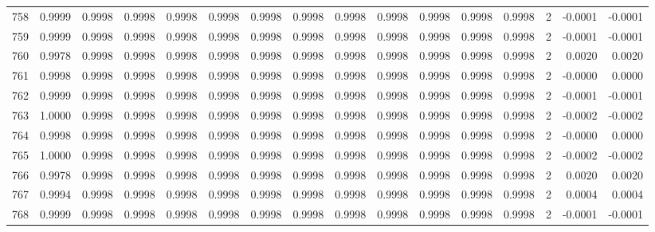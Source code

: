 \begin{tabular}{lrrrrrrrrrrrrrrr}
758 &      0.9999 &  0.9998 &  0.9998 &  0.9998 &  0.9998 &  0.9998 &  0.9998 &  0.9998 &  0.9998 &  0.9998 &   0.9998 &     0.9998 &      2 &                   -0.0001 &                    -0.0001 \\
759 &      0.9999 &  0.9998 &  0.9998 &  0.9998 &  0.9998 &  0.9998 &  0.9998 &  0.9998 &  0.9998 &  0.9998 &   0.9998 &     0.9998 &      2 &                   -0.0001 &                    -0.0001 \\
760 &      0.9978 &  0.9998 &  0.9998 &  0.9998 &  0.9998 &  0.9998 &  0.9998 &  0.9998 &  0.9998 &  0.9998 &   0.9998 &     0.9998 &      2 &                    0.0020 &                     0.0020 \\
761 &      0.9998 &  0.9998 &  0.9998 &  0.9998 &  0.9998 &  0.9998 &  0.9998 &  0.9998 &  0.9998 &  0.9998 &   0.9998 &     0.9998 &      2 &                   -0.0000 &                     0.0000 \\
762 &      0.9999 &  0.9998 &  0.9998 &  0.9998 &  0.9998 &  0.9998 &  0.9998 &  0.9998 &  0.9998 &  0.9998 &   0.9998 &     0.9998 &      2 &                   -0.0001 &                    -0.0001 \\
763 &      1.0000 &  0.9998 &  0.9998 &  0.9998 &  0.9998 &  0.9998 &  0.9998 &  0.9998 &  0.9998 &  0.9998 &   0.9998 &     0.9998 &      2 &                   -0.0002 &                    -0.0002 \\
764 &      0.9998 &  0.9998 &  0.9998 &  0.9998 &  0.9998 &  0.9998 &  0.9998 &  0.9998 &  0.9998 &  0.9998 &   0.9998 &     0.9998 &      2 &                   -0.0000 &                     0.0000 \\
765 &      1.0000 &  0.9998 &  0.9998 &  0.9998 &  0.9998 &  0.9998 &  0.9998 &  0.9998 &  0.9998 &  0.9998 &   0.9998 &     0.9998 &      2 &                   -0.0002 &                    -0.0002 \\
766 &      0.9978 &  0.9998 &  0.9998 &  0.9998 &  0.9998 &  0.9998 &  0.9998 &  0.9998 &  0.9998 &  0.9998 &   0.9998 &     0.9998 &      2 &                    0.0020 &                     0.0020 \\
767 &      0.9994 &  0.9998 &  0.9998 &  0.9998 &  0.9998 &  0.9998 &  0.9998 &  0.9998 &  0.9998 &  0.9998 &   0.9998 &     0.9998 &      2 &                    0.0004 &                     0.0004 \\
768 &      0.9999 &  0.9998 &  0.9998 &  0.9998 &  0.9998 &  0.9998 &  0.9998 &  0.9998 &  0.9998 &  0.9998 &   0.9998 &     0.9998 &      2 &                   -0.0001 &                    -0.0001 \\

\end{tabular}
